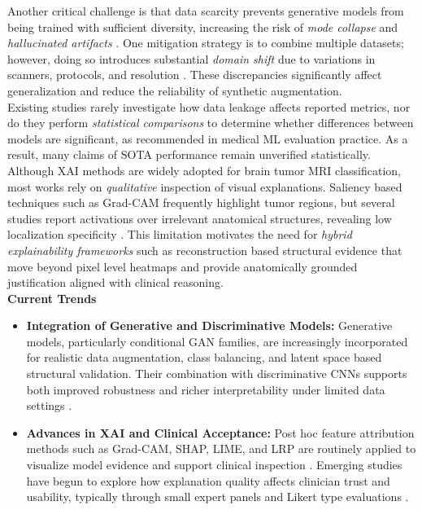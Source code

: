 Another critical challenge is that data scarcity prevents generative models from being trained with sufficient diversity, increasing the risk of \textit{mode collapse} and \textit{hallucinated artifacts} \cite{GHASSEMI2020101678,Fetty2020}. One mitigation strategy is to combine multiple datasets; however, doing so introduces substantial \textit{domain shift} due to variations in scanners, protocols, and resolution \cite{Zhan2021,zuo2025multichannel}. These discrepancies significantly affect generalization and reduce the reliability of synthetic augmentation.\\

Existing studies rarely investigate how data leakage affects reported metrics, nor do they perform \textit{statistical comparisons} to determine whether differences between models are significant, as recommended in medical ML evaluation practice. As a result, many claims of SOTA performance remain unverified statistically.\\

Although XAI methods are widely adopted for brain tumor MRI classification, most works rely on \textit{qualitative} inspection of visual explanations. Saliency based techniques such as Grad-CAM frequently highlight tumor regions, but several studies report activations over irrelevant anatomical structures, revealing low localization specificity \cite{roy2024explainable,gaur2022explanation}. This limitation motivates the need for \textit{hybrid explainability frameworks} such as reconstruction based structural evidence that move beyond pixel level heatmaps and provide anatomically grounded justification aligned with clinical reasoning.\\

\textbf{Current Trends}

\begin{itemize}
    \item \textbf{Integration of Generative and Discriminative Models:} Generative models, particularly conditional GAN families, are increasingly incorporated for realistic data augmentation, class balancing, and latent space based structural validation. Their combination with discriminative CNNs supports both improved robustness and richer interpretability under limited data settings \cite{GHASSEMI2020101678,li2020tumorgan,Fetty2020}. 
    
    
    \item \textbf{Advances in XAI and Clinical Acceptance:} Post hoc feature attribution methods such as Grad-CAM, SHAP, LIME, and LRP are routinely applied to visualize model evidence and support clinical inspection \cite{esmaeili2021explainable,gaur2022explanation,mandloi2024explainable}. Emerging studies have begun to explore how explanation quality affects clinician trust and usability, typically through small expert panels and Likert type evaluations \cite{manz2025do,wang2023chatcad}. 
    
\end{itemize}

